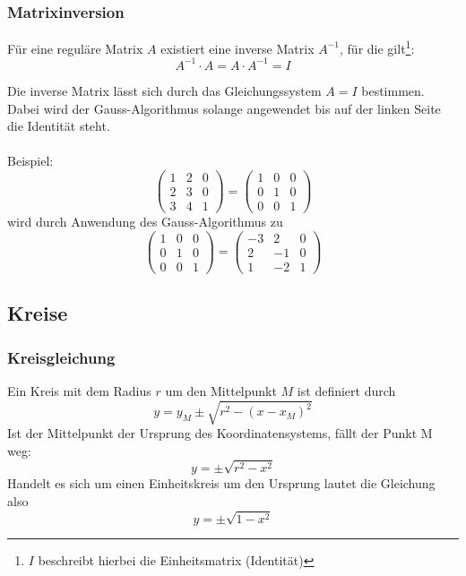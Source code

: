 \subsubsection{Matrixinversion} 
\label{ssub:matrixinversion}

Für eine reguläre Matrix $A$ existiert eine inverse Matrix $A^{-1}$, für die gilt\footnote{$I$ beschreibt hierbei
 die Einheitsmatrix (Identität)}: 
\begin{equation}
	A^{-1} \cdot A = A \cdot A^{-1} = I
\end{equation}

Die inverse Matrix lässt sich durch das Gleichungssystem $A = I$ bestimmen. Dabei wird der Gauss-Algorithmus solange
angewendet bis auf der linken Seite die Identität steht.\\\\
Beispiel:
\begin{displaymath}
	\left(\begin{matrix}1 & 2 & 0\\2 & 3 & 0 \\ 3 & 4 & 1\end{matrix}\right) = 
	\left(\begin{matrix}1 & 0 & 0\\0 & 1 & 0 \\ 0 & 0 & 1\end{matrix}\right)
\end{displaymath}
wird durch Anwendung des Gauss-Algorithmus zu
\begin{displaymath}
	\left(\begin{matrix}1 & 0 & 0\\0 & 1 & 0 \\ 0 & 0 & 1\end{matrix}\right) = 
	\left(\begin{matrix}-3 & 2 & 0\\2 & -1 & 0 \\ 1 & -2 & 1\end{matrix}\right)
\end{displaymath}

\subsection{Kreise} 
\label{sub:kreise}

\subsubsection{Kreisgleichung} 
\label{ssub:kreisgleichung}

Ein Kreis mit dem Radius $r$ um den Mittelpunkt $M$ ist definiert durch
\begin{equation}
	y = y_M \pm \sqrt{r^2 - (x-x_M)^2}
\end{equation}
Ist der Mittelpunkt der Ursprung des Koordinatensystems, fällt der Punkt M weg:
\begin{displaymath}
	y = \pm \sqrt{r^2-x^2}
\end{displaymath}
Handelt es sich um einen Einheitskreis um den Ursprung lautet die Gleichung also
\begin{displaymath}
	y = \pm \sqrt{1-x^2}
\end{displaymath}
